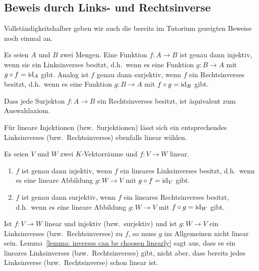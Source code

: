 \subsection{Beweis durch Links- und Rechtsinverse}

Vollständigkeitshalber geben wir auch die bereits im Tutorium gezeigten Beweise noch einmal an.

\begin{recall}
  Es seien $A$ und $B$ zwei Mengen.
  Eine Funktion $f \colon A \to B$ ist genau dann injektiv, wenn sie ein Linksinverses besitzt, d.h.\ wenn es eine Funktion $g \colon B \to A$ mit $g \circ f = \operatorname{id}_A$ gibt.
  Analog ist $f$ genau dann surjektiv, wenn $f$ ein Rechtsinverses besitzt, d.h.\ wenn es eine Funktion $g \colon B \to A$ mit $f \circ g = \operatorname{id}_B$ gibt.
\end{recall}

\begin{remark}
  Dass jede Surjekton $f \colon A \to B$ ein Rechtsinverses besitzt, ist äquivalent zum Auswahlaxiom.
\end{remark}

Für lineare Injektionen (bzw.\ Surjektionen) lässt sich ein entsprechendes Linksinverses (bzw.\ Rechtsinverses) ebenfalls linear wählen.

\begin{lemma}
  \label{lemma: inverses can be choosen linearly}
  Es seien $V$ und $W$ zwei $K$-Vektorräume und $f \colon V \to W$ linear.
  \begin{enumerate}
    \item
      $f$ ist genau dann injektiv, wenn $f$ ein lineares Linksinverses besitzt, d.h.\ wenn es eine lineare Abbildung $g \colon W \to V$ mit $g \circ f = \operatorname{id}_V$ gibt.
    \item
      $f$ ist genau dann surjektiv, wenn $f$ ein lineares Rechtsinverses besitzt, d.h.\ wenn es eine lineare Abbildung $g \colon W \to V$ mit $f \circ g = \operatorname{id}_W$ gibt.
  \end{enumerate}
\end{lemma}

\begin{warning}
  Ist $f \colon V \to W$ linear und injektiv (bzw.\ surjektiv) und ist $g \colon W \to V$ ein Linksinverses (bzw.\ Rechtsinverses) zu $f$, so muss $g$ im Allgemeinen nicht linear sein.
  Lemma~\ref{lemma: inverses can be choosen linearly} sagt aus, dass es ein lineares Linksinverses (bzw.\ Rechtsinverses) gibt, nicht aber, dass bereits jedes Linksinverse (bzw.\ Rechtsinverse) schon linear ist.
\end{warning}

